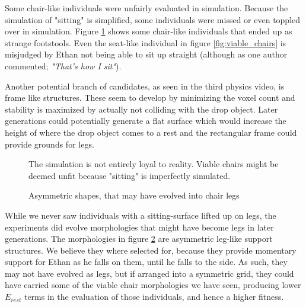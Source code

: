 Some chair-like individuals were unfairly evaluated in simulation. Because the
simulation of "sitting" is simplified, some individuals were missed or even
toppled over in simulation. Figure \ref{fig:footstools} shows some chair-like
individuals that ended up as strange footstools. Even the seat-like individual
in figure \ref{fig:viable_chairs} is misjudged by Ethan not being able to sit up
straight (although as one author commented; \emph{"That's how I sit"}).

Another potential branch of candidates, as seen in the third physics video\cite{vid:physics3}, is frame like structures.
These seem to develop by minimizing the voxel count and stability is maximized by actually not colliding with the drop object.
Later generations could potentially generate a flat surface which would increase the height of 
where the drop object comes to a rest and the rectangular frame could provide grounds for legs. 

\begin{figure}[ht]
	\centering
	 \hfil
	\caption{The simulation is not entirely loyal to reality. Viable chairs
	might be deemed unfit because "sitting" is imperfectly simulated.}
	\label{fig:footstools}
\end{figure}

\begin{figure}[h]
\centering
{}
\hfil
{}
\caption{Asymmetric shapes, that may have evolved into chair legs}
\label{fig:chair_legs}
\end{figure}

While we never saw individuals with a sitting-surface lifted up on legs, the
experiments did evolve morphologies that might have become legs in later
generations. The morphologies in figure \ref{fig:chair_legs} are asymmetric
leg-like support structures. We believe they where selected for, because they
provide momentary support for Ethan as he falls on them, until he falls to the
side. As such, they may not have evolved as legs, but if arranged into a
symmetric grid, they could have carried some of the viable chair morphologies we
have seen, producing lower $E_{rest}$ terms in the evaluation of those
individuals, and hence a higher fitness.
